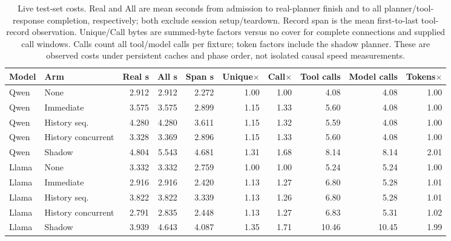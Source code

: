 \begin{table}[t]\centering\small
\caption{Live test-set costs. Real and All are mean seconds from admission to real-planner finish and to all planner/tool-response completion, respectively; both exclude session setup/teardown. Record span is the mean first-to-last tool-record observation. Unique/Call bytes are summed-byte factors versus no cover for complete connections and supplied call windows. Calls count all tool/model calls per fixture; token factors include the shadow planner. These are observed costs under persistent caches and phase order, not isolated causal speed measurements.}
\label{tab:live-costs}
\setlength{\tabcolsep}{3.2pt}
\begin{tabularx}{\textwidth}{@{}lYrrrrrrrr@{}}\toprule
Model & Arm & Real s & All s & Span s & Unique$\times$ & Call$\times$ & Tool calls & Model calls & Tokens$\times$\\\midrule
Qwen & None & 2.912 & 2.912 & 2.272 & 1.00 & 1.00 & 4.08 & 4.08 & 1.00 \\
Qwen & Immediate & 3.575 & 3.575 & 2.899 & 1.15 & 1.33 & 5.60 & 4.08 & 1.00 \\
Qwen & History seq. & 4.280 & 4.280 & 3.611 & 1.15 & 1.32 & 5.59 & 4.08 & 1.00 \\
Qwen & History concurrent & 3.328 & 3.369 & 2.896 & 1.15 & 1.33 & 5.60 & 4.08 & 1.00 \\
Qwen & Shadow & 4.804 & 5.543 & 4.681 & 1.31 & 1.68 & 8.14 & 8.14 & 2.01 \\
\midrule
Llama & None & 3.332 & 3.332 & 2.759 & 1.00 & 1.00 & 5.24 & 5.24 & 1.00 \\
Llama & Immediate & 2.916 & 2.916 & 2.420 & 1.13 & 1.27 & 6.80 & 5.28 & 1.01 \\
Llama & History seq. & 3.822 & 3.822 & 3.339 & 1.13 & 1.26 & 6.80 & 5.28 & 1.01 \\
Llama & History concurrent & 2.791 & 2.835 & 2.448 & 1.13 & 1.27 & 6.83 & 5.31 & 1.02 \\
Llama & Shadow & 3.939 & 4.643 & 4.087 & 1.35 & 1.71 & 10.46 & 10.45 & 1.99 \\
\bottomrule\end{tabularx}
\end{table}
